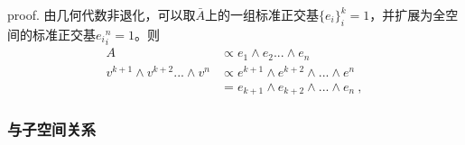 proof.
由几何代数非退化，可以取$\bar A$上的一组标准正交基$\{e_i\}^k_i=1$，并扩展为全空间的标准正交基${e_i}^n_i=1$。则
\begin{equation}
\begin{aligned}
A&\propto e_1\wedge e_2...\wedge e_n\\
v^{k+1}\wedge v^{k+2}...\wedge v^n&\propto e^{k+1}\wedge e^{k+2}\wedge...\wedge e^n\\
&=e_{k+1}\wedge e_{k+2}\wedge...\wedge e_n~,
\end{aligned}
\end{equation}

\subsubsection{与子空间关系}